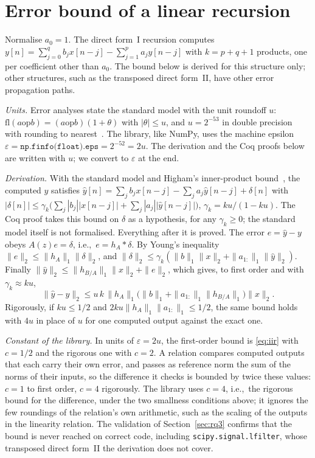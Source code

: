 \documentclass[10pt,conference]{IEEEtran}
\newcommand{\eps}{\varepsilon}
\newcommand{\code}[1]{\texttt{#1}}
\newcommand{\ie}{i.e.,\ }
\begin{document}
\section{Error bound of a linear recursion}
\label{app:iir}
Normalise $a_0=1$. The direct form~I recursion computes
$y[n]=\sum_{j=0}^{q}b_jx[n-j]-\sum_{j=1}^{p}a_jy[n-j]$ with $k=p+q+1$ products,
one per coefficient other than $a_0$. The bound below is derived for this
structure only; other structures, such as the transposed direct form~II, have
other error propagation paths.

\emph{Units.} Error analyses state the standard model with the unit roundoff
$u$: $\mathrm{fl}(a\mathbin{\mathrm{op}}b)=(a\mathbin{\mathrm{op}}b)(1+\theta)$
with $|\theta|\le u$, and $u=2^{-53}$ in double precision with rounding to
nearest~\cite{higham2002accuracy}. The library, like NumPy, uses the machine
epsilon $\eps=\code{np.finfo(float).eps}=2^{-52}=2u$. The derivation and the
Coq proofs below are written with $u$; we convert to $\eps$ at the end.

\emph{Derivation.} With the standard model and Higham's inner-product
bound~\cite{higham2002accuracy}, the computed $\hat y$ satisfies
$\hat y[n]=\sum_jb_jx[n-j]-\sum_ja_j\hat y[n-j]+\delta[n]$ with
$|\delta[n]|\le\gamma_k\bigl(\sum_j|b_j||x[n-j]|+\sum_j|a_j||\hat y[n-j]|\bigr)$,
$\gamma_k=ku/(1-ku)$. The Coq proof takes this bound on $\delta$ as a
hypothesis, for any $\gamma_k\ge0$; the standard model itself is not
formalised. Everything after it is proved. The error $e=\hat y-y$ obeys
$A(z)e=\delta$, \ie $e=h_A*\delta$. By Young's inequality
$\|e\|_2\le\|h_A\|_1\|\delta\|_2$, and
$\|\delta\|_2\le\gamma_k(\|b\|_1\|x\|_2+\|a_{1:}\|_1\|\hat y\|_2)$. Finally
$\|\hat y\|_2\le\|h_{B/A}\|_1\|x\|_2+\|e\|_2$, which gives, to first order and
with $\gamma_k\approx ku$,
\[
\|\hat y-y\|_2\le u\,k\,\|h_A\|_1\bigl(\|b\|_1+\|a_{1:}\|_1\|h_{B/A}\|_1\bigr)\|x\|_2 .
\]
Rigorously, if $ku\le1/2$ and $2ku\|h_A\|_1\|a_{1:}\|_1\le1/2$, the same bound
holds with $4u$ in place of $u$ for one computed output against the exact one.

\emph{Constant of the library.} In units of $\eps=2u$, the first-order bound
is \eqref{eq:iir} with $c=1/2$ and the rigorous one with $c=2$. A relation
compares computed outputs that each carry their own error, and passes as
reference norm the sum of the norms of their inputs, so the difference it
checks is bounded by twice these values: $c=1$ to first order, $c=4$
rigorously. The library uses $c=4$, \ie the rigorous bound for the difference,
under the two smallness conditions above; it ignores the few roundings of the
relation's own arithmetic, such as the scaling of the outputs in the linearity
relation. The validation of
Section~\ref{sec:rq3} confirms that the bound is never reached on correct
code, including \code{scipy.signal.lfilter}, whose transposed direct form~II
the derivation does not cover.
\end{document}
